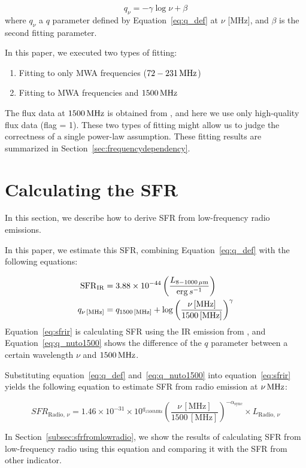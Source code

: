 \begin{equation}\label{eq:q_fitting}
    q_{\nu} = -\gamma\log{\nu} + \beta
\end{equation}
where $q_{\nu}$ a $q$ parameter defined by Equation~\ref{eq:q_def} at $\nu$ [MHz], and $\beta$ is the second fitting parameter.

In this paper, we executed two types of fitting:

\begin{enumerate}
    \item Fitting to only MWA frequencies ($72-231\,\mathrm{MHz}$)
    \item Fitting to MWA frequencies and $1500\,\mathrm{MHz}$
\end{enumerate}

The flux data at $1500\,\mathrm{MHz}$ is obtained from \citet{Boselli2015}, and here we use only high-quality flux data (flag = 1).
These two types of fitting might allow us to judge the correctness of a single power-law assumption.
These fitting results are summarized in Section~\ref{sec:frequencydependency}.



\section{Calculating the SFR}\label{sec:calculatingsfr}
In this section, we describe how to derive SFR from low-frequency radio emissions.

In this paper, we estimate this SFR, combining Equation~\ref{eq:q_def} with the following equations:

\begin{align}
    \mathrm{SFR}_{\mathrm{IR}} &= 3.88 \times 10^{-44}\left(\frac{L_{\mathrm{8-1000\,\mu m}}}{\mathrm{erg}\,s^{-1}}\right)\label{eq:sfrir}\\
    q_{\nu\,[\mathrm{MHz}]} &= q_{1500\,[\mathrm{MHz}]} + \log{\left(\frac{\nu\,[\mathrm{MHz}]}{1500\,[\mathrm{MHz}]}\right)}^{\gamma}\label{eq:q_nuto1500}
\end{align}
Equation~\ref{eq:sfrir} is calculating SFR using the IR emission from \citet{Murphy2011}, and Equation~\ref{eq:q_nuto1500} shows the difference of the $q$ parameter between a certain wavelength $\nu$ and $1500\,\mathrm{MHz}$.

Substituting equation~\ref{eq:q_def} and~\ref{eq:q_nuto1500} into equation~\ref{eq:sfrir} yields the following equation to estimate SFR from radio emission at $\nu\,\mathrm{MHz}$:

\begin{equation}\label{eq:sfrfromradio}
    SFR_{\mathrm{Radio},\,\nu} = 1.46\times10^{-31}\times 10^{q_{1500\mathrm{MHz}}} {\left(\frac{\nu\,[\mathrm{MHz}]}{1500\,[\mathrm{MHz}]}\right)}^{-\alpha_{\mathrm{sync}}} \times L_{\mathrm{Radio},\,\nu}
\end{equation}

In Section~\ref{subsec:sfrfromlowradio}, we show the results of calculating SFR from low-frequency radio using this equation and comparing it with the SFR from other indicator.



%
%

